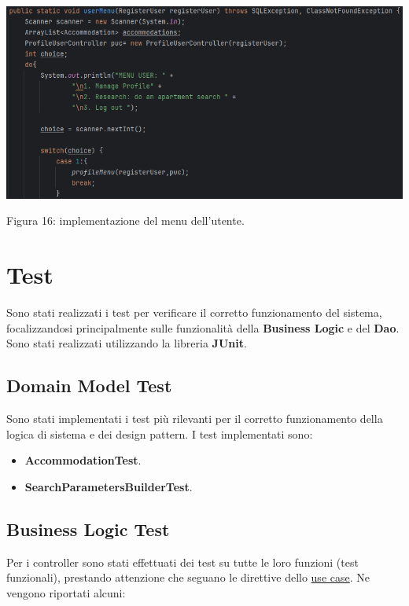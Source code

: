 \documentclass[10pt]{article}
\begin{document}
\begin{center}
\hspace*{-0.75cm}
\includegraphics[scale=0.6]{cli/usermenu}
\par\medskip
Figura 16: implementazione del menu dell'utente.
\par\medskip
\end{center} 

\section{Test}

Sono stati realizzati i test per verificare il corretto funzionamento del sistema, focalizzandosi principalmente sulle funzionalità della \textbf{Business Logic} e del \textbf{Dao}. Sono stati realizzati utilizzando la libreria \textbf{JUnit}. 

\subsection{Domain Model Test}

Sono stati implementati i test più rilevanti per il corretto funzionamento della logica di sistema e dei design pattern.
I test implementati sono: 
\begin{itemize}
\item \textbf{AccommodationTest}.
\item \textbf{SearchParametersBuilderTest}.
\end{itemize}

\subsection{Business Logic Test}

Per i controller sono stati effettuati dei test su tutte le loro funzioni (test funzionali), prestando attenzione che seguano le direttive dello \hyperref[usecase]{use case}.
Ne vengono riportati alcuni:
\end{document}
